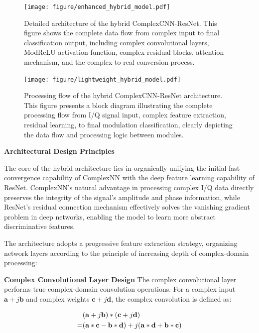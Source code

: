 \documentclass[conference]{IEEEtran}
\begin{document}
\begin{figure}[htbp]
\centering
\texttt{[image: figure/enhanced\_hybrid\_model.pdf]}
\caption{Detailed architecture of the hybrid ComplexCNN-ResNet. This figure shows the complete data flow from complex input to final classification output, including complex convolutional layers, ModReLU activation function, complex residual blocks, attention mechanism, and the complex-to-real conversion process.}
\label{fig:enhanced_hybrid_model}
\end{figure}


\begin{figure}[htbp]
\centering
\texttt{[image: figure/lightweight\_hybrid\_model.pdf]}
\caption{Processing flow of the hybrid ComplexCNN-ResNet architecture. This figure presents a block diagram illustrating the complete processing flow from I/Q signal input, complex feature extraction, residual learning, to final modulation classification, clearly depicting the data flow and processing logic between modules.}
\label{fig:lightweight_hybrid_model_flow}
\end{figure}

\textbf{Architectural Design Principles}

The core of the hybrid architecture lies in organically unifying the initial fast convergence capability of ComplexNN with the deep feature learning capability of ResNet. ComplexNN's natural advantage in processing complex I/Q data directly preserves the integrity of the signal's amplitude and phase information, while ResNet's residual connection mechanism effectively solves the vanishing gradient problem in deep networks, enabling the model to learn more abstract discriminative features.

The architecture adopts a progressive feature extraction strategy, organizing network layers according to the principle of increasing depth of complex-domain processing:

\textbf{Complex Convolutional Layer Design} The complex convolutional layer performs true complex-domain convolution operations. For a complex input $\mathbf{a} + j\mathbf{b}$ and complex weights $\mathbf{c} + j\mathbf{d}$, the complex convolution is defined as:

\begin{align}
&(\mathbf{a} + j\mathbf{b}) * (\mathbf{c} + j\mathbf{d}) \notag \\
= &(\mathbf{a} * \mathbf{c} - \mathbf{b} * \mathbf{d}) 
+ j(\mathbf{a} * \mathbf{d} + \mathbf{b} * \mathbf{c})
\end{align}
\end{document}
